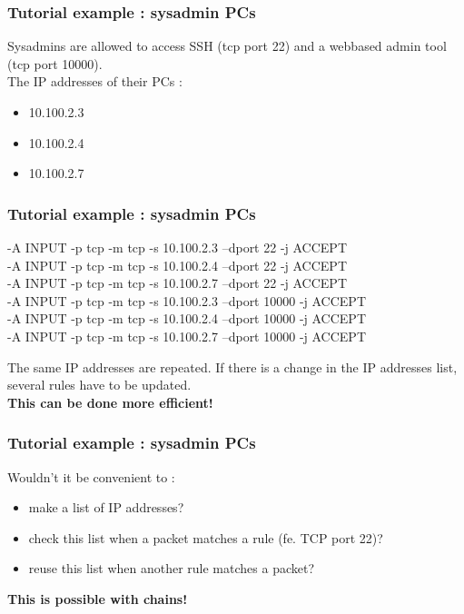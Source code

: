 \documentclass[14pt]{beamer}
\begin{document}
  \begin{frame}
    \frametitle{Tutorial example : sysadmin PCs}
    Sysadmins are allowed to access SSH (tcp port 22) and a webbased admin tool (tcp port 10000).\\
    The IP addresses of their PCs :
    \begin{itemize}
	\item 10.100.2.3
	\item 10.100.2.4
	\item 10.100.2.7
    \end{itemize}
  \end{frame}
  \begin{frame}
    \frametitle{Tutorial example : sysadmin PCs}
    \begin{example}
      \small{-A INPUT -p tcp -m tcp -s 10.100.2.3 --dport 22 -j ACCEPT\\
      -A INPUT -p tcp -m tcp -s 10.100.2.4 --dport 22 -j ACCEPT\\
      -A INPUT -p tcp -m tcp -s 10.100.2.7 --dport 22 -j ACCEPT\\
      -A INPUT -p tcp -m tcp -s 10.100.2.3 --dport 10000 -j ACCEPT\\
      -A INPUT -p tcp -m tcp -s 10.100.2.4 --dport 10000 -j ACCEPT\\
      -A INPUT -p tcp -m tcp -s 10.100.2.7 --dport 10000 -j ACCEPT}
    \end{example}
    \pause
    The same IP addresses are repeated. If there is a change in the IP addresses list, several rules have to be updated.\\
    \pause
    \textbf{This can be done more efficient!}
  \end{frame}
  \begin{frame}
    \frametitle{Tutorial example : sysadmin PCs}
    Wouldn't it be convenient to :
    \begin{itemize}
      \item make a list of IP addresses?
      \item check this list when a packet matches a rule (fe. TCP port 22)?
      \item reuse this list when another rule matches a packet?
    \end{itemize}
    \pause
    \textbf{This is possible with chains!}
  \end{frame}
\end{document}
